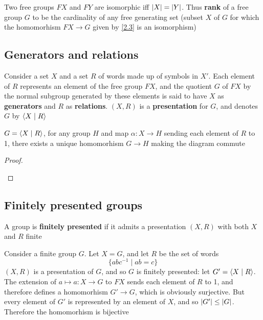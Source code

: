 \documentclass[11pt]{article}
\begin{document}
Two free groups \(FX\) and \(FY\) are isomorphic iff \(\abs{X}=\abs{Y}\). Thus \textbf{rank} of a free
group \(G\) to be the cardinality of any free generating set (subset \(X\) of \(G\) for which
the homomorhism \(FX\to G\) given by \ref{2.3} is an isomorphism)
\subsection{Generators and relations}
\label{sec:orgbf48b8e}
Consider a set \(X\) and a set \(R\) of words made up of symbols in \(X'\). Each element
of \(R\) represents an element of the free group \(FX\), and the quotient \(G\) of \(FX\) by the
normal subgroup generated by these elements is said to have \(X\) as \textbf{generators} and \(R\) as
\textbf{relations}. \((X,R)\) is a \textbf{presentation} for \(G\), and denotes \(G\) by \(\langle X\mid R\rangle\)

\begin{proposition}[]
\(G=\langle X\mid R\rangle\), for any group \(H\) and map \(\alpha:X\to H\) sending each element of \(R\) to 1, there
exists a unique homomorhism \(G\to H\) making the diagram commute
\begin{center}\end{center}
\end{proposition}

\begin{proof}
\begin{center}\end{center}
\end{proof}
\subsection{Finitely presented groups}
\label{sec:org9b5d4f3}

A group is \textbf{finitely presented} if it admits a presentation \((X,R)\) with both \(X\) and \(R\)
finite

\begin{examplle}[]
Consider a finite group \(G\). Let \(X=G\), and let \(R\) be the set of words
\begin{equation*}
\{abc^{-1}\mid ab=c\}
\end{equation*}
\((X,R)\) is a presentation of \(G\), and so \(G\) is finitely presented: let \(G'=\langle X\mid R\rangle\).
The extension of \(a\mapsto a:X\to G\) to \(FX\) sends each element of \(R\) to 1, and therefore defines
a homomorhism \(G'\to G\), which is obviously surjective. But every element of \(G'\) is
represented by an element of \(X\), and so \(\abs{G'}\le\abs{G}\). Therefore the homomorhism is bijective
\end{examplle}
\end{document}
